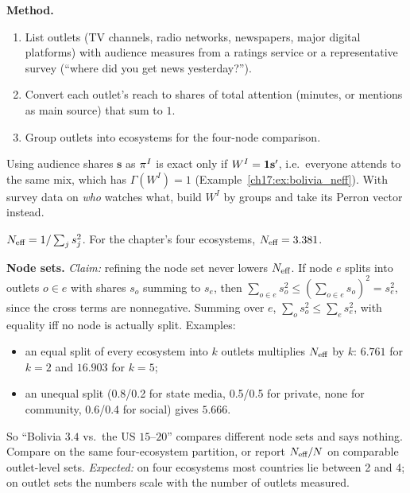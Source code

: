 \documentclass[../solutions_manual.tex]{subfiles}
\begin{document}
 \textbf{Method.}
\begin{enumerate}
\item List outlets (TV channels, radio networks, newspapers, major digital platforms) with audience measures from a ratings service or a representative survey (``where did you get news yesterday?'').
\item Convert each outlet's reach to shares of total attention (minutes, or mentions as main source) that sum to $1$.
\item Group outlets into ecosystems for the four-node comparison.
\end{enumerate}
Using audience shares $\mathbf{s}$ as $\pi^I$ is exact only if $W^I = \mathbf{1}\mathbf{s}'$, i.e.\ everyone attends to the same mix, which has $\Gamma(W^I) = 1$ (Example~\ref{ch17:ex:bolivia_neff}). With survey data on \emph{who} watches what, build $W^I$ by groups and take its Perron vector instead.

 $N_{\text{eff}} = 1/\sum_j s_j^2$. For the chapter's four ecosystems, $N_{\text{eff}} = 3.381$.

 \textbf{Node sets.} \emph{Claim:} refining the node set never lowers $N_{\text{eff}}$. If node $e$ splits into outlets $o \in e$ with shares $s_o$ summing to $s_e$, then $\sum_{o\in e}s_o^2 \le (\sum_{o\in e}s_o)^2 = s_e^2$, since the cross terms are nonnegative. Summing over $e$, $\sum_o s_o^2 \le \sum_e s_e^2$, with equality iff no node is actually split. Examples:
\begin{itemize}
\item an equal split of every ecosystem into $k$ outlets multiplies $N_{\text{eff}}$ by $k$: $6.761$ for $k = 2$ and $16.903$ for $k = 5$;
\item an unequal split (0.8/0.2 for state media, 0.5/0.5 for private, none for community, 0.6/0.4 for social) gives $5.666$.
\end{itemize}
So ``Bolivia $3.4$ vs.\ the US $15$--$20$'' compares different node sets and says nothing. Compare on the same four-ecosystem partition, or report $N_{\text{eff}}/N$ on comparable outlet-level sets. \emph{Expected:} on four ecosystems most countries lie between 2 and 4; on outlet sets the numbers scale with the number of outlets measured.

\end{document}
